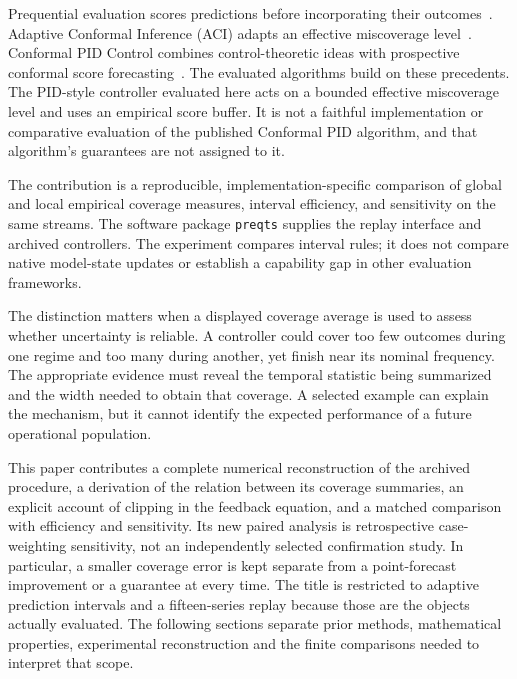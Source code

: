 \documentclass[11pt,a4paper]{article}
\begin{document}
Prequential evaluation scores predictions before incorporating their outcomes~\cite{dawid1984}. Adaptive Conformal Inference (ACI) adapts an effective miscoverage level~\cite{gibbs2021}. Conformal PID Control combines control-theoretic ideas with prospective conformal score forecasting~\cite{angelopoulos2023}. The evaluated algorithms build on these precedents. The PID-style controller evaluated here acts on a bounded effective miscoverage level and uses an empirical score buffer. It is not a faithful implementation or comparative evaluation of the published Conformal PID algorithm, and that algorithm's guarantees are not assigned to it.

The contribution is a reproducible, implementation-specific comparison of global and local empirical coverage measures, interval efficiency, and sensitivity on the same streams. The software package \texttt{preqts} supplies the replay interface and archived controllers. The experiment compares interval rules; it does not compare native model-state updates or establish a capability gap in other evaluation frameworks.

The distinction matters when a displayed coverage average is used to assess whether uncertainty is reliable. A controller could cover too few outcomes during one regime and too many during another, yet finish near its nominal frequency. The appropriate evidence must reveal the temporal statistic being summarized and the width needed to obtain that coverage. A selected example can explain the mechanism, but it cannot identify the expected performance of a future operational population.

This paper contributes a complete numerical reconstruction of the archived procedure, a derivation of the relation between its coverage summaries, an explicit account of clipping in the feedback equation, and a matched comparison with efficiency and sensitivity. Its new paired analysis is retrospective case-weighting sensitivity, not an independently selected confirmation study. In particular, a smaller coverage error is kept separate from a point-forecast improvement or a guarantee at every time. The title is restricted to adaptive prediction intervals and a fifteen-series replay because those are the objects actually evaluated. The following sections separate prior methods, mathematical properties, experimental reconstruction and the finite comparisons needed to interpret that scope.


\end{document}
